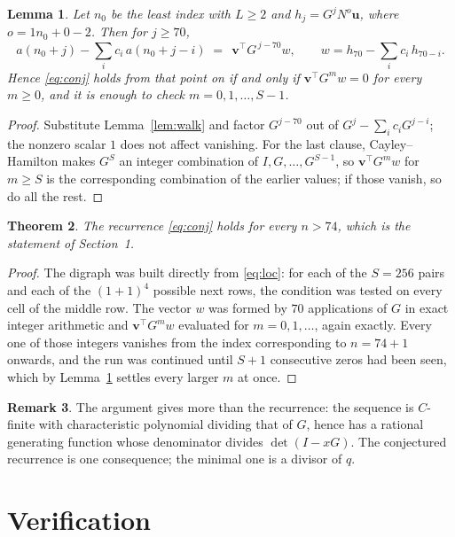 \documentclass[11pt,a4paper]{article}
\theoremstyle{plain}
\newtheorem{theorem}{Theorem}
\newtheorem{lemma}[theorem]{Lemma}
\theoremstyle{definition}
\newtheorem{remark}[theorem]{Remark}
\begin{document}
\begin{lemma}\label{lem:crit}
Let $n_0$ be the least index with $L\ge2$ and $h_j=G^{j}N^{o}\mathbf{u}$, where
$o=1n_0+0-2$. Then for $j\ge70$,
\[
a(n_0+j)-\sum_i c_i\,a(n_0+j-i)\;=\;\,\mathbf{v}^{\!\top}G^{\,j-70}w,
\qquad w=h_{70}-\sum_i c_i\,h_{70-i} .
\]
Hence \eqref{eq:conj} holds from that point on if and only if
$\mathbf{v}^{\!\top}G^{m}w=0$ for every $m\ge0$, and it is enough to check
$m=0,1,\dots,S-1$.
\end{lemma}

\begin{proof}
Substitute Lemma~\ref{lem:walk} and factor $G^{j-70}$ out of
$G^{j}-\sum_ic_iG^{j-i}$; the nonzero scalar $1$ does not affect
vanishing. For the last clause, Cayley--Hamilton makes $G^{S}$ an integer combination of
$I,G,\dots,G^{S-1}$, so $\mathbf{v}^{\!\top}G^{m}w$ for $m\ge S$ is the corresponding
combination of the earlier values; if those vanish, so do all the rest.
\end{proof}

\begin{theorem}
The recurrence \eqref{eq:conj} holds for every $n>74$, which is the statement of
Section~1.
\end{theorem}

\begin{proof}
The digraph was built directly from \eqref{eq:loc}: for each of the $S=256$ pairs and each
of the $(1+1)^{4}$ possible next rows, the condition was tested on every cell of
the middle row. The vector $w$ was formed by $70$ applications of $G$ in exact integer
arithmetic and $\mathbf{v}^{\!\top}G^{m}w$ evaluated for $m=0,1,\dots$, again exactly.
Every one of those integers vanishes from the index corresponding to $n=74+1$ onwards,
and the run was continued until $S+1$ consecutive zeros had been seen, which by
Lemma~\ref{lem:crit} settles every larger $m$ at once.
\end{proof}

\begin{remark}
The argument gives more than the recurrence: the sequence is $C$-finite with characteristic
polynomial dividing that of $G$, hence has a rational generating function whose denominator
divides $\det(I-xG)$. The conjectured recurrence is one consequence; the minimal one is a
divisor of $q$.
\end{remark}

\section{Verification}
\end{document}
